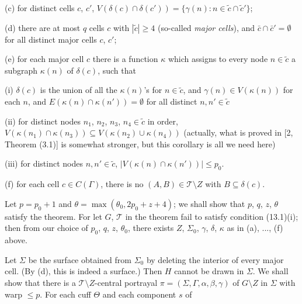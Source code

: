 \hspace*{12pt}(c) for distinct cells $c$, $c'$, $V(\delta(c) \cap \delta(c')) = \{\gamma(n) \colon n \in \tilde{c} \cap \tilde{c}'\}$;

\hspace*{12pt}(d) there are at most $q$ cells $c$ with $|\tilde{c}| \ge 4$ (so-called \textit{major cells}), and $\bar{c} \cap \bar{c}' = \emptyset$ for all distinct major cells $c$, $c'$;

\hspace*{12pt}(e) for each major cell $c$ there is a function $\kappa$ which assigns to every node $n \in \tilde{c}$ a subgraph $\kappa(n)$ of $\delta(c)$, such that

\hspace*{12pt}(i) $\delta(c)$ is the union of all the $\kappa(n)$'s for $n \in \tilde{c}$, and $\gamma(n) \in V(\kappa(n))$ for each $n$, and $E(\kappa(n) \cap \kappa(n')) = \emptyset$ for all distinct $n, n' \in \tilde{c}$

\hspace*{12pt}(ii) for distinct nodes $n_1$, $n_2$, $n_3$, $n_4 \in \tilde{c}$ in order, $V(\kappa(n_1) \cap \kappa(n_3)) \subseteq V(\kappa(n_2) \cup \kappa(n_4))$ (actually, what is proved in [2, Theorem (3.1)] is somewhat stronger, but this corollary is all we need here)

\hspace*{12pt}(iii) for distinct nodes $n, n' \in \tilde{c}$, $|V(\kappa(n) \cap \kappa(n'))| \le p_0$.

\hspace*{12pt}(f) for each cell $c \in C(\Gamma)$, there is no $(A, B) \in \mathcal{T} \setminus Z$ with $B \subseteq \delta(c)$.

Let $p = p_0 + 1$ and $\theta = \max(\theta_0, 2p_0 + z + 4)$; we shall show that $p$, $q$, $z$, $\theta$ satisfy the theorem. For let $G$, $\mathcal{T}$ in the theorem fail to satisfy condition (13.1)(i); then from our choice of $p_0$, $q$, $z$, $\theta_0$, there exists $Z$, $\Sigma_0$, $\gamma$, $\delta$, $\kappa$ as in (a), ..., (f) above.

Let $\Sigma$ be the surface obtained from $\Sigma_0$ by deleting the interior of every major cell. (By (d), this is indeed a surface.) Then $H$ cannot be drawn in $\Sigma$. We shall show that there is a $\mathcal{T} \setminus Z$-central portrayal $\pi = (\Sigma, \Gamma, \alpha, \beta, \gamma)$ of $G \setminus Z$ in $\Sigma$ with warp $\le p$. For each cuff $\Theta$ and each component $s$ of
